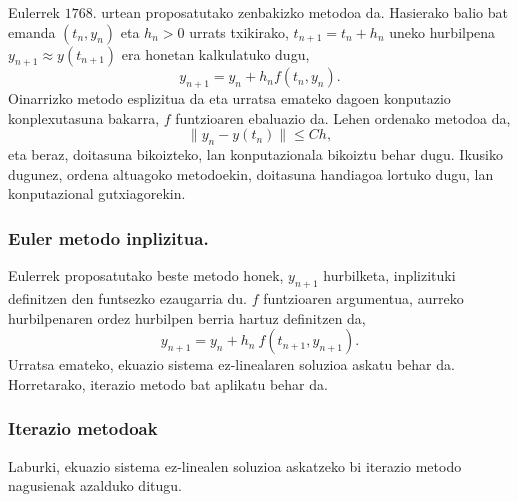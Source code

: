 Eulerrek $1768.$ urtean proposatutako zenbakizko metodoa da. Hasierako balio bat emanda $(t_n,y_n)$ eta $h_n>0$ urrats txikirako, $t_{n+1}=t_{n}+h_{n}$ uneko hurbilpena $y_ {n+1} \approx y(t_{n+1})$ era honetan kalkulatuko dugu,  
\begin{equation*}
 \label{eq:202a}
y_{n+1}=y_{n}+h_n f(t_n,y_n).
\end{equation*}
Oinarrizko metodo esplizitua da eta urratsa emateko dagoen konputazio konplexutasuna bakarra, $f$ funtzioaren ebaluazio da. Lehen ordenako metodoa da,
\begin{equation*}
\|y_n-y(t_n)\| \leqslant C h,
\end{equation*}
eta beraz, doitasuna bikoizteko, lan konputazionala bikoiztu behar dugu. Ikusiko dugunez, ordena altuagoko metodoekin, doitasuna handiagoa lortuko dugu, lan konputazional gutxiagorekin. 

\subsubsection*{Euler metodo inplizitua.}

Eulerrek proposatutako beste metodo honek, $y_{n+1}$ hurbilketa, inplizituki definitzen den funtsezko ezaugarria du. $f$ funtzioaren argumentua, aurreko hurbilpenaren ordez hurbilpen berria hartuz definitzen da,
\begin{equation*}
 \label{eq:202b}
y_{n+1}=y_{n}+h_n \ f(t_{n+1},y_{n+1}).
\end{equation*}
Urratsa emateko, ekuazio sistema ez-linealaren soluzioa askatu behar da. Horretarako, iterazio metodo bat aplikatu behar da.

\subsubsection*{Iterazio metodoak}

Laburki, ekuazio sistema ez-linealen soluzioa askatzeko bi iterazio metodo nagusienak azalduko ditugu.


